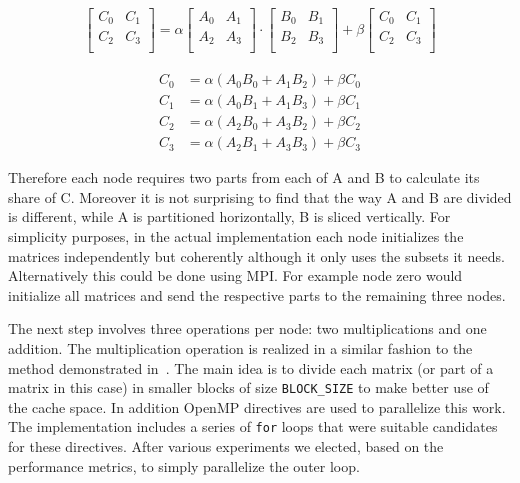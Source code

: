 \begin{align}
    \begin{bmatrix}
      C_0 & C_1 \\
      C_2 & C_3 \\
    \end{bmatrix}
= \alpha
    \begin{bmatrix}
      A_0 & A_1 \\
      A_2 & A_3 \\
    \end{bmatrix}
\cdot
    \begin{bmatrix}
      B_0 & B_1 \\
      B_2 & B_3 \\
    \end{bmatrix}
+ \beta
    \begin{bmatrix}
      C_0 & C_1 \\
      C_2 & C_3 \\
    \end{bmatrix}
\label{eq:partition}
\end{align}

\begin{align}
C_0 &= \alpha (A_0 B_0 + A_1 B_2) + \beta C_0\\
C_1 &= \alpha (A_0 B_1 + A_1 B_3) + \beta C_1\\
C_2 &= \alpha (A_2 B_0 + A_3 B_2) + \beta C_2\\
C_3 &= \alpha (A_2 B_1 + A_3 B_3) + \beta C_3
\label{eq:partition2}
\end{align}

Therefore each node requires two parts from each of A and B to calculate its share of C. Moreover it is not surprising to find that the way A and B are divided is different, while A is partitioned horizontally, B is sliced vertically. For simplicity purposes, in the actual implementation each node initializes the matrices independently but coherently although it only uses the subsets it needs. Alternatively this could be done using MPI. For example node zero would initialize all matrices and send the respective parts to the remaining three nodes.

The next step involves three operations per node: two multiplications and one addition. The multiplication operation is realized in a similar fashion to the method demonstrated in~\cite{chien}. The main idea is to divide each matrix (or part of a matrix in this case) in smaller blocks of size \texttt{BLOCK\_SIZE} to make better use of the cache space. In addition OpenMP directives are used to parallelize this work. The implementation includes a series of \texttt{for} loops that were suitable candidates for these directives. After various experiments we elected, based on the performance metrics, to simply parallelize the outer loop.

